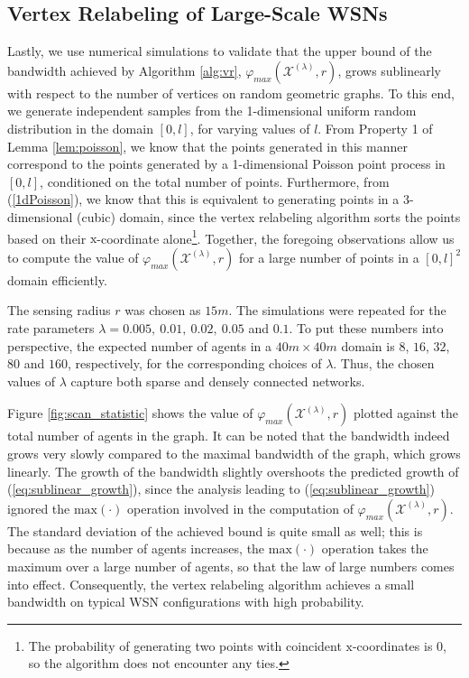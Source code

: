 \documentclass[twocolumn]{article}
\theoremstyle{plain}
\theoremstyle{definition}
\theoremstyle{definition}
\theoremstyle{remark}
\begin{document}
\subsection{Vertex Relabeling of Large-Scale WSNs}
Lastly, we use numerical simulations to validate that the upper bound of the bandwidth achieved by Algorithm \ref{alg:vr}, $\varphi _{\textit{max}}(\mathcal X^{(\lambda)}, r)$, grows sublinearly with respect to the number of vertices on random geometric graphs. To this end, we generate independent samples from the 1-dimensional uniform random distribution in the domain $[0,l]$, for varying values of $l$. From Property 1 of Lemma \ref{lem:poisson}, we know that the points generated in this manner correspond to the points generated by a 1-dimensional Poisson point process in $[0,l]$, conditioned on the total number of points.
Furthermore, from (\ref{1dPoisson}), we know that this is equivalent to generating points in a 3-dimensional (cubic) domain, since the vertex relabeling algorithm sorts the points based on their $\textrm{x}$-coordinate alone\footnote{The probability of generating two points with coincident $\textrm{x}$-coordinates is 0, so the algorithm does not encounter any ties.}.
Together, the foregoing observations allow us to compute the value of $\varphi _{\textit{max}}(\mathcal X^{(\lambda)}, r)$ for a large number of points in a $[0,l]^2$ domain efficiently.

The sensing radius $r$ was chosen as $15m$. 
The simulations were repeated for the rate parameters $\lambda =  0.005,\ 0.01,\ 0.02,\ 0.05 $ and $ 0.1$. To put these numbers into perspective, the expected number of agents in a $40m \times 40m$ domain is
$8$, $16$, $32$, $80$ and $160$, respectively, for the corresponding choices of $\lambda$. Thus, the chosen values of $\lambda$ capture both sparse and densely connected networks.

Figure \ref{fig:scan_statistic} shows the value of $\varphi _{\textit{max}}(\mathcal X^{(\lambda)}, r)$ plotted against the total number of agents in the graph. It can be noted that the bandwidth indeed grows very slowly compared to the maximal bandwidth of the graph, which grows linearly. The growth of the bandwidth slightly overshoots the predicted growth of (\ref{eq:sublinear_growth}), since the analysis leading to (\ref{eq:sublinear_growth}) ignored the $\textrm{max}(\cdot)$ operation involved in the computation of $\varphi _{\textit{max}}(\mathcal X^{(\lambda)}, r)$. The standard deviation of the achieved bound is quite small as well; this is because as the number of agents increases, the $\textrm{max}(\cdot)$ operation takes the maximum over a large number of agents, so that the law of large numbers comes into effect. Consequently, the vertex relabeling algorithm achieves a small bandwidth on typical WSN configurations with high probability.
\end{document}
